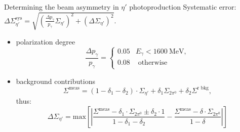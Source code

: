 \documentclass[11pt,aspectratio=169,dvipsnames]{beamer}
\begin{document}
	\begin{frame}{Determining the beam asymmetry in $\eta'$ photoproduction}
	Systematic error: $
		\Delta\Sigma_{\eta'}^\text{sys}=\sqrt{\left(\frac{\Delta p_\gamma}{p_\gamma}\Sigma_{\eta'}\right)^2+\left(\Delta\Sigma_{\eta'}\right)^2}.$
	\begin{itemize}
		\item polarization degree \begin{equation*}
			\frac{\Delta p_\gamma}{p_\gamma}=\begin{cases}
				0.05 & E_\gamma<\SI{1600}{\mega\eV},\\ 
				0.08 & \text{ otherwise }\\
			\end{cases}
		\end{equation*}
	\item background contributions
	\begin{equation*}
		\Sigma^\text{meas}=\left(1-\delta_1-\delta_2\right)\cdot\Sigma_{\eta'}+\delta_1\Sigma_{2\pi^0}+\delta_2\Sigma^\text{r bkg},
	\end{equation*}
	thus:
	\begin{equation*}
		\Delta\Sigma_{\eta'}=\text{max}\left[\left|\frac{\Sigma^\text{meas}-\delta_1\cdot\Sigma_{2\pi^0}\pm\delta_2\cdot1}{1-\delta_1-\delta_2}-\frac{\Sigma^\text{meas}-\delta\cdot\Sigma_{2\pi^0}}{1-\delta}\right|\right]
	\end{equation*}
	\begin{flushright}
		\cites{farahphd,eberhardt_phd}
	\end{flushright}
	\end{itemize}
	\end{frame}
\end{document}
